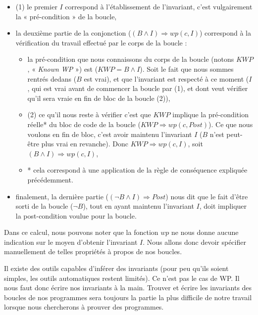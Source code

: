 \begin{itemize}
\item (1) le premier $I$ correspond à l'établissement de l'invariant, c'est 
vulgairement la « pré-condition » de la boucle,
\item la deuxième partie de la conjonction ($(B \wedge I) \Rightarrow wp(c, I)$)
correspond à la vérification du travail effectué par le corps de la boucle :

\begin{itemize}
\item la pré-condition que nous connaissons du corps de la boucle (notons $KWP$,
« \textit{Known WP} ») est ($KWP = B \wedge I$). Soit le fait que nous sommes
rentrés dedans ($B$ est vrai), et que l'invariant est respecté à ce moment
($I$, qui est vrai avant de commencer la boucle par (1), et dont veut 
vérifier qu'il sera vraie en fin de bloc de la boucle (2)),
\item (2) ce qu'il nous reste à vérifier c'est que $KWP$ implique la 
pré-condition réelle* du bloc de code de la boucle 
  ($KWP \Rightarrow wp(c, Post)$). Ce que nous voulons en fin de bloc, 
  c'est avoir maintenu l'invariant $I$ ($B$ n'est peut-être plus vrai en
  revanche). Donc 
$KWP \Rightarrow wp(c, I)$, soit $(B \wedge I) \Rightarrow wp(c, I)$,
\item * cela correspond à une application de la règle de conséquence expliquée
précédemment.
\end{itemize}
\item finalement, la dernière partie ($(\neg B \wedge I) \Rightarrow Post$)
nous dit que le fait d'être sorti de la boucle ($\neg B$), tout en ayant 
maintenu l'invariant $I$, doit impliquer la post-condition voulue pour la 
boucle.
\end{itemize}


Dans ce calcul, nous pouvons noter que la fonction $wp$ ne nous donne aucune
indication sur le moyen d'obtenir l'invariant $I$. Nous allons donc devoir 
spécifier manuellement de telles propriétés à propos de nos boucles.





Il existe des outils capables d'inférer des invariants (pour peu qu'ils soient
simples, les outils automatiques restent limités). Ce n'est pas le cas de WP.
Il nous faut donc écrire nos invariants à la main. Trouver et écrire les 
invariants des boucles de nos programmes sera toujours la partie la plus difficile
de notre travail lorsque nous chercherons à prouver des programmes.



